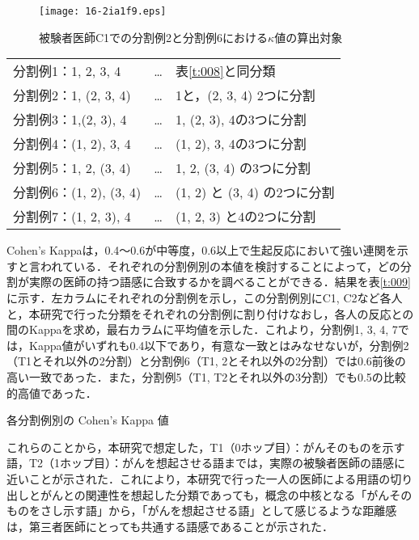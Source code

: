 \documentclass[japanese]{jnlp_1.4}
\begin{document}
\begin{figure}[b]
\vspace{-5pt}
 \begin{center}
  \texttt{[image: 16-2ia1f9.eps]}
 \end{center}
 \caption{被験者医師C1での分割例2と分割例6における$\kappa$値の算出対象}
 \label{f:009}
\end{figure}

\begin{tabular}{lcl}
 分割例1：1, 2, 3, 4    & … & 表\ref{t:008}と同分類 \\
 分割例2：1, (2, 3, 4)  & … & 1と，(2, 3, 4) 2つに分割 \\
 分割例3：1,(2, 3), 4   & … & 1, (2, 3), 4の3つに分割 \\
 分割例4：(1, 2), 3, 4   & … & (1, 2), 3, 4の3つに分割 \\
 分割例5：1, 2, (3, 4)   & … &1, 2, (3, 4) の3つに分割 \\
 分割例6：(1, 2), (3, 4) & … & (1, 2) と (3, 4) の2つに分割 \\
 分割例7：(1, 2, 3), 4   & … & (1, 2, 3) と4の2つに分割 \\
\end{tabular}


Cohen's Kappaは，0.4〜0.6が中等度，0.6以上で生起反応において強い連関を示すと言われている\cite{c17}．それぞれの分割例別の本値を検討することによって，どの分割が実際の医師の持つ語感に合致するかを調べることができる．結果を表\ref{t:009}に示す．左カラムにそれぞれの分割例を示し，この分割例別にC1, C2など各人と，本研究で行った分類をそれぞれの分割例に割り付けなおし，各人の反応との間のKappaを求め，最右カラムに平均値を示した．これより，分割例1, 3, 4, 7では，Kappa値がいずれも0.4以下であり，有意な一致とはみなせないが，分割例2（T1とそれ以外の2分割）と分割例6（T1, 2とそれ以外の2分割）では0.6前後の高い一致であった．また，分割例5（T1, T2とそれ以外の3分割）でも0.5の比較的高値であった．

\begin{table}[t]
 \caption{各分割例別の Cohen's Kappa 値}
 \begin{center}

 \end{center}
 \label{t:009}
\end{table}

これらのことから，本研究で想定した，T1（0ホップ目）：がんそのものを示す語，T2（1ホップ目）：がんを想起させる語までは，実際の被験者医師の語感に近いことが示された．これにより，本研究で行った一人の医師による用語の切り出しとがんとの関連性を想起した分類であっても，概念の中核となる「がんそのものをさし示す語」から，「がんを想起させる語」として感じるような距離感は，第三者医師にとっても共通する語感であることが示された．
\end{document}
